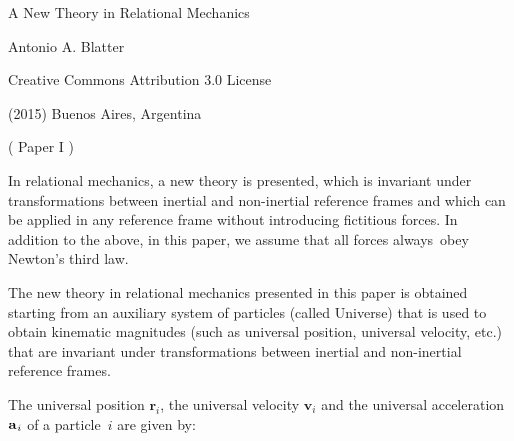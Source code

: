 \documentclass[10pt]{article}
\begin{document}

\begin{center}

{\LARGE A New Theory in Relational Mechanics}

\bigskip \medskip

{\large Antonio A. Blatter}

\bigskip \medskip

\small

Creative Commons Attribution 3.0 License

\smallskip

(2015) Buenos Aires, Argentina

\medskip

{\sc ( Paper I )}

\smallskip

\bigskip \medskip

\parbox{107.40mm}{In relational mechanics, a new theory is presented, which is invariant under transformations between inertial and non-inertial reference frames and which can be applied in any reference frame without introducing fictitious forces. In addition to the above, in this paper, we assume that all forces \hbox {always obey} Newton's third law.}

\end{center}

\normalsize

\vspace{-1.20em}

\par {}

\par \bigskip\smallskip \noindent The new theory in relational mechanics presented in this paper is obtained starting from an auxiliary system of particles (called Universe) that is used to obtain kinematic magnitudes (such as universal position, universal velocity, etc.) that are invariant under transformations between inertial and non-inertial reference frames.

\par \bigskip \noindent The universal position ${\mathbf{r}}_i$, the universal velocity ${\mathbf{v}}_i$ and the universal acceleration ${\mathbf{a}}_{\hspace{+0.045em}i}$ of a \hbox {particle $i$} are given by:
\end{document}
